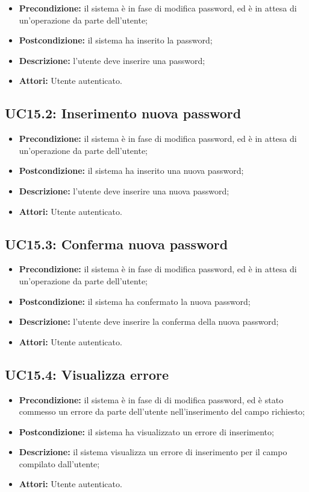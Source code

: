 \begin{itemize}
	\item \textbf{Precondizione:} il sistema è in fase di modifica password, ed è in attesa di un'operazione da parte dell'utente;
	\item \textbf{Postcondizione:} il sistema ha inserito la password;
	\item \textbf{Descrizione:} l'utente deve inserire una password;
	\item \textbf{Attori:} Utente autenticato.
\end{itemize}
\subsection{ UC15.2: Inserimento nuova password}

\begin{itemize}
	\item \textbf{Precondizione:} il sistema è in fase di modifica password, ed è in attesa di un'operazione da parte dell'utente;
	\item \textbf{Postcondizione:} il sistema ha inserito una nuova password;
	\item \textbf{Descrizione:} l'utente deve inserire una nuova password;
	\item \textbf{Attori:} Utente autenticato.
\end{itemize}
\subsection{ UC15.3: Conferma nuova password}

\begin{itemize}
	\item \textbf{Precondizione:} il sistema è in fase di modifica password, ed è in attesa di un'operazione da parte dell'utente;
	\item \textbf{Postcondizione:} il sistema ha confermato la nuova password;
	\item \textbf{Descrizione:} l'utente deve inserire la conferma della nuova password;
	\item \textbf{Attori:} Utente autenticato.
\end{itemize}
\subsection{ UC15.4: Visualizza errore}

\begin{itemize}
	\item \textbf{Precondizione:} il sistema è in fase di di modifica password, ed è stato commesso un errore da parte dell'utente nell'inserimento del campo richiesto;
	\item \textbf{Postcondizione:} il sistema ha visualizzato un errore di inserimento;
	\item \textbf{Descrizione:} il sistema visualizza un errore di inserimento per il campo compilato dall'utente;
	\item \textbf{Attori:} Utente autenticato.
\end{itemize}

